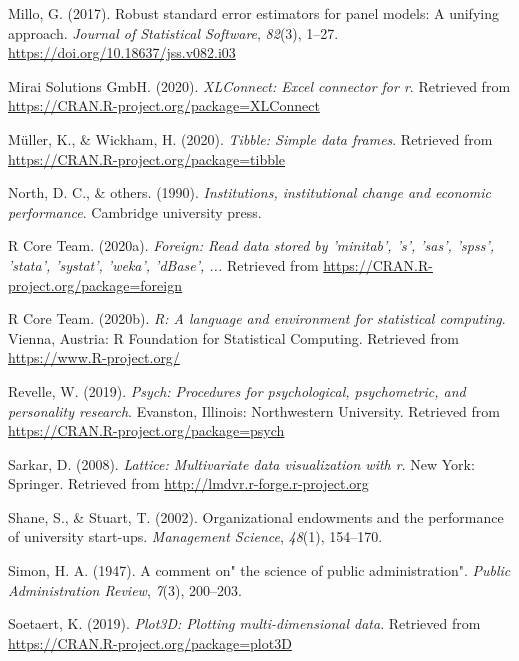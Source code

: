 \documentclass[
  english,
  man]{apa6}
\begin{document}
\leavevmode\hypertarget{ref-R-plm_b}{}%
Millo, G. (2017). Robust standard error estimators for panel models: A unifying approach. \emph{Journal of Statistical Software}, \emph{82}(3), 1--27. \url{https://doi.org/10.18637/jss.v082.i03}

\leavevmode\hypertarget{ref-R-XLConnect}{}%
Mirai Solutions GmbH. (2020). \emph{XLConnect: Excel connector for r}. Retrieved from \url{https://CRAN.R-project.org/package=XLConnect}

\leavevmode\hypertarget{ref-R-tibble}{}%
Müller, K., \& Wickham, H. (2020). \emph{Tibble: Simple data frames}. Retrieved from \url{https://CRAN.R-project.org/package=tibble}

\leavevmode\hypertarget{ref-north1990institutions}{}%
North, D. C., \& others. (1990). \emph{Institutions, institutional change and economic performance}. Cambridge university press.

\leavevmode\hypertarget{ref-R-foreign}{}%
R Core Team. (2020a). \emph{Foreign: Read data stored by 'minitab', 's', 'sas', 'spss', 'stata', 'systat', 'weka', 'dBase', ...} Retrieved from \url{https://CRAN.R-project.org/package=foreign}

\leavevmode\hypertarget{ref-R-base}{}%
R Core Team. (2020b). \emph{R: A language and environment for statistical computing}. Vienna, Austria: R Foundation for Statistical Computing. Retrieved from \url{https://www.R-project.org/}

\leavevmode\hypertarget{ref-R-psych}{}%
Revelle, W. (2019). \emph{Psych: Procedures for psychological, psychometric, and personality research}. Evanston, Illinois: Northwestern University. Retrieved from \url{https://CRAN.R-project.org/package=psych}

\leavevmode\hypertarget{ref-R-lattice}{}%
Sarkar, D. (2008). \emph{Lattice: Multivariate data visualization with r}. New York: Springer. Retrieved from \url{http://lmdvr.r-forge.r-project.org}

\leavevmode\hypertarget{ref-shane2002organizational}{}%
Shane, S., \& Stuart, T. (2002). Organizational endowments and the performance of university start-ups. \emph{Management Science}, \emph{48}(1), 154--170.

\leavevmode\hypertarget{ref-simon1947comment}{}%
Simon, H. A. (1947). A comment on" the science of public administration". \emph{Public Administration Review}, \emph{7}(3), 200--203.

\leavevmode\hypertarget{ref-R-plot3D}{}%
Soetaert, K. (2019). \emph{Plot3D: Plotting multi-dimensional data}. Retrieved from \url{https://CRAN.R-project.org/package=plot3D}
\end{document}
